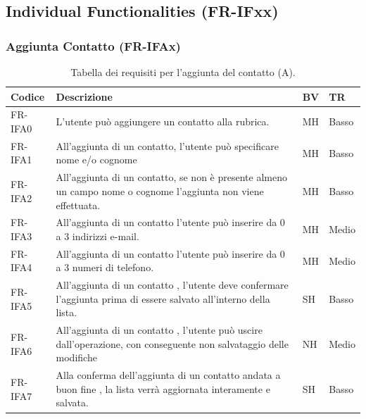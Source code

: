 \documentclass[a4paper,12pt]{article}
\begin{document}
    \subsection{Individual Functionalities (FR-IFxx)}
    \subsubsection{Aggiunta Contatto (FR-IFAx)}
    \begin{table}[h!]
        \centering
        \begin{tabular}{|l|p{8cm}|l|l|}
            \hline
            \textbf{Codice} & \textbf{Descrizione} & \textbf{BV} & \textbf{TR} \\
            \hline
            FR-IFA0 & L'utente può aggiungere un contatto alla rubrica. &
            MH &
            Basso \\
            \hline
            FR-IFA1 & All'aggiunta di un contatto, l'utente può specificare nome e/o cognome & MH & Basso \\
            \hline
            FR-IFA2 & All'aggiunta di un contatto, se non è presente almeno un campo nome o cognome l'aggiunta non viene effettuata. & MH & Basso \\
            \hline
            FR-IFA3 & All'aggiunta di un contatto l'utente può inserire da 0 a 3 indirizzi e-mail. & MH & Medio \\
            \hline
            FR-IFA4 & All'aggiunta di un contatto l'utente può inserire da 0 a 3 numeri di telefono. & MH & Medio \\
            \hline
            FR-IFA5 & All'aggiunta di un contatto , l'utente deve confermare l'aggiunta prima di essere salvato all'interno della lista. & SH & Basso \\
            \hline
            FR-IFA6 & All'aggiunta di un contatto , l'utente può uscire dall'operazione, con conseguente non salvataggio delle modifiche & NH & Medio \\
            \hline
            FR-IFA7 & Alla conferma dell'aggiunta di un contatto andata a buon fine , la lista verrà aggiornata interamente e salvata. & SH & Basso \\
            \hline
        \end{tabular}
        \caption{Tabella dei requisiti per l’aggiunta del contatto (A).}
    \end{table}
\end{document}
